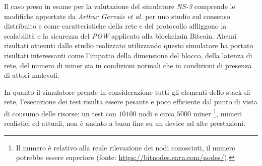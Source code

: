 Il caso preso in esame per la valutazione del simulatore \textit{NS-3} comprende le modifiche apportate da \textit{Arthur Gervais et al.} per uno studio sul consenso distribuito e come caratteristiche della rete e del protocollo affliggono la scalabilità e la sicurezza del \textit{POW} applicato alla blockchain Bitcoin.\newline
Alcuni risultati ottenuti dallo studio realizzato utilizzando questo simulatore ha portato risultati interessanti come l'impatto della dimensione del blocco, della latenza di rete, del numero di miner sia in condizioni normali che in condizioni di presenza di attori malevoli.
\begin{table}[H]
    \centering
    \caption{Numero di blocchi \textit{stale} e transazioni per secondo raggiungibili con 16 miner nella rete e diverse dimensioni dei blocchi}
\end{table}
In quanto il simulatore prende in considerazione tutti gli elementi dello stack di rete, l'esecuzione dei test risulta essere pesante e poco efficiente dal punto di vista di consumo delle risorse: un test con $10100$ nodi e circa $5000$ miner \footnote{Il numero è relativo alla reale rilevazione dei nodi conosciuti, il numero potrebbe essere superiore (fonte: \href{https://bitnodes.earn.com/nodes/}{https://bitnodes.earn.com/nodes/}).}, numeri realistici ed attuali, non è andato a buon fine su un device ad alte prestazioni.\newline
